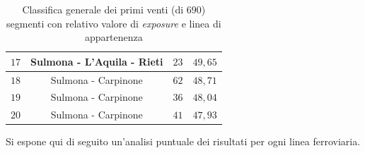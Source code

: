 \begin{table}[hpt]
\begin{tabular}{|c|c|c|c|}
$17$ & Sulmona - L'Aquila - Rieti & $23$        & $49,65$                     \\ \hline \rowcolor{flamingopink}
$18$ & Sulmona - Carpinone        & $62$        & $48,71$                     \\ \hline \rowcolor{flamingopink}
$19$ & Sulmona - Carpinone        & $36$        & $48,04$                     \\ \hline \rowcolor{flamingopink}
$20$ & Sulmona - Carpinone        & $41$        & $47,93$                     \\ \hline 
\end{tabular}
\caption{Classifica generale dei primi venti (di $690$) segmenti con relativo valore di \textit{exposure} e linea di appartenenza}
\label{top20segmenti}
\end{table} 
\newpage
Si espone qui di seguito un'analisi puntuale dei risultati per ogni linea ferroviaria.

